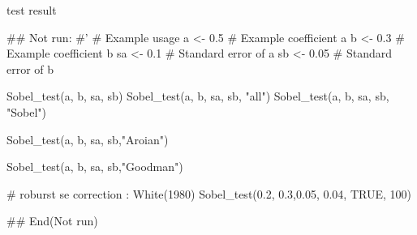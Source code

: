 \documentclass[a4paper]{book}
\begin{document}
%
\begin{Value}
test result
\end{Value}
%
\begin{Examples}
\begin{ExampleCode}

\#\# Not run: 
#'
# Example usage
a <- 0.5  # Example coefficient a
b <- 0.3  # Example coefficient b
sa <- 0.1 # Standard error of a
sb <- 0.05 # Standard error of b

Sobel_test(a, b, sa, sb)
Sobel_test(a, b, sa, sb, "all")
Sobel_test(a, b, sa, sb, "Sobel")

Sobel_test(a, b, sa, sb,"Aroian")

Sobel_test(a, b, sa, sb,"Goodman")


# roburst se correction : White(1980)
Sobel_test(0.2, 0.3,0.05, 0.04, TRUE, 100)


## End(Not run)

\end{ExampleCode}
\end{Examples}
\end{document}
